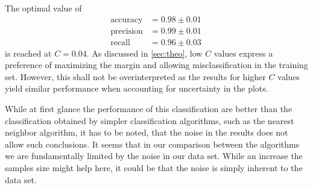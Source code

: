 \documentclass[12pt, a4paper]{scrartcl}
\begin{document}
The optimal value of
\begin{align*}
	\text{accuracy} &= 0.98 \pm 0.01 \\
	\text{precision} &= 0.99 \pm 0.01 \\
	\text{recall} &= 0.96 \pm 0.03 \
\end{align*}
is reached at $C = 0.04$. As discussed in \cref{sec:theo}, low $C$ values express a preference of maximizing the margin and allowing misclassification in the training set. However, this shall not be overinterpreted as the results for higher $C$ values yield similar performance when accounting for uncertainty in the plots.

While at first glance the performance of this classification are better than the classification obtained by simpler classification algorithms, such as the nearest neighbor algorithm, it has to be noted, that the noise in the results does not allow such conclusions. It seems that in our comparison between the algorithms we are fundamentally limited by the noise in our data set. While an increase the samples size might help here, it could be that the noise is simply inherent to the data set.
\end{document}
